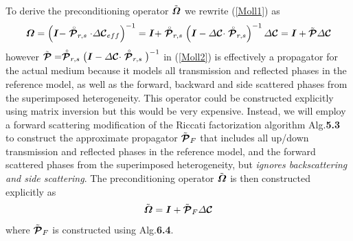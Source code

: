 To derive the preconditioning operator $\tilde{\bmi \Omega}$ we rewrite 
(\ref{Moll1}) as
\begin{equation} \label{Moll2}
{\bmi \Omega}=\left( {\bmi I} - \rf{\CB P}_{r,s}\cdot {\mit \Delta}{\CB 
C}_{eff}   \right)^{-1}
={\bmi I}+\rf{\CB P}_{r,s}\left( {\bmi I} - {\mit \Delta} {\CB C}\cdot  
\rf{\CB P}_{r,s}  \right)^{-1}{\mit \Delta} {\CB C}
={\bmi I}+\tilde{\CB P}{\mit \Delta} {\CB C}
\end{equation}
however $\tilde{\CB P}=\rf{\CB P}_{r,s}\big( {\bmi I} - {\mit \Delta} {\CB 
C}\cdot  \rf{\CB P}_{r,s}  
\big)^{-1}$ in (\ref{Moll2})
 is effectively a propagator for the 
actual medium because it models
all transmission and reflected phases in the 
 reference model, as well as the forward, backward and side scattered 
phases from the superimposed 
 heterogeneity. This operator could be constructed explicitly using 
matrix inversion  but this would be very 
expensive. Instead,  we will employ a forward scattering modification of
 the Riccati factorization algorithm 
 Alg.{\bf 5.3}  to construct the approximate propagator $\tilde{\CB P}_F$ 
that includes all 
 up/down transmission and reflected phases in the 
 reference model, and the forward scattered phases from the superimposed 
 heterogeneity, but {\em ignores backscattering and side scattering\/}.
   The preconditioning operator $\tilde{\bmi \Omega}$ is 
 then constructed explicitly as
\begin{equation} \label{Mollprecon}
\tilde{\bmi \Omega}=
{\bmi I}+\tilde{\CB P}_F {\mit \Delta} {\CB C}
\end{equation}
where $\tilde{\CB P}_F$ is constructed using Alg.{\bf 6.4}.

